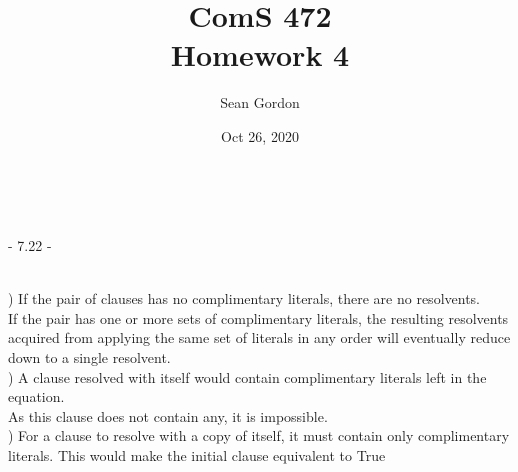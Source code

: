 \documentclass[12pt]{article}
\title{ComS 472\\Homework 4}
\author{Sean Gordon}
\date{Oct 26, 2020}
\begin{document}
\maketitle

\ \\
\centerline{- 7.22 - }
\ \\
) If the pair of clauses has no complimentary literals, there are no resolvents. \checkmark\\[.4em]
\indent If the pair has one or more sets of complimentary literals, the resulting resolvents \\
\indent acquired from applying the same set of literals in any order will eventually reduce\\
\indent down to a single resolvent. \checkmark\\

) A clause resolved with itself would contain complimentary literals left in the equation.\\
\indent As this clause does not contain any, it is impossible.\\[.4em]

) For a clause to resolve with a copy of itself, it must contain only complimentary \\[.4em]
\indent literals. This would make the initial clause equivalent to True\\[.4em]



\noindent \hrulefill \pagebreak
\end{document}
